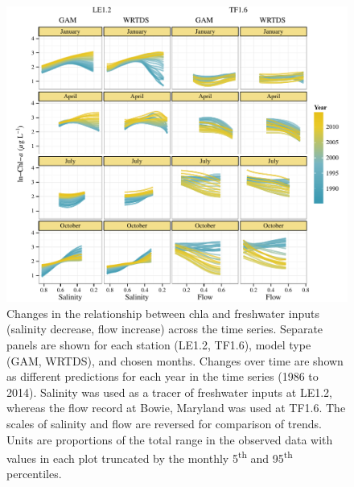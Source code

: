 \documentclass[letterpaper,12pt,oneside]{article}\usepackage[]{graphicx}\usepackage[]{color}
\begin{document}
\begin{figure}[!ht]

{\centering \includegraphics[width=1.02\textwidth]{figs/dynafig-1} 

}

\caption{Changes in the relationship between \ac{chla} and freshwater inputs (salinity decrease, flow increase) across the time series.  Separate panels are shown for each station (LE1.2, TF1.6), model type (GAM, WRTDS), and chosen months.  Changes over time are shown as different predictions for each year in the time series (1986 to 2014).  Salinity was used as a tracer of freshwater inputs at LE1.2, whereas the flow record at Bowie, Maryland was used at TF1.6.  The scales of salinity and flow are reversed for comparison of trends. Units are proportions of the total range in the observed data with values in each plot truncated by the monthly 5\textsuperscript{th} and 95\textsuperscript{th} percentiles.}\label{fig:dynafig}
\end{figure}
\end{document}
